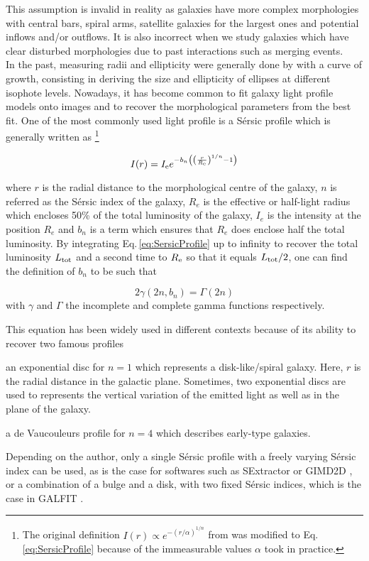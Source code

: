 This assumption is invalid in reality as galaxies have more complex morphologies with central bars, spiral arms, satellite galaxies for the largest ones and potential inflows and/or outflows. It is also incorrect when we study galaxies which have clear disturbed morphologies due to past interactions such as merging events.  \\

In the past, measuring radii and ellipticity were generally done by with a curve of growth, consisting in deriving the size and ellipticity of ellipses at different isophote levels. Nowadays, it has become common to fit galaxy light profile models onto images and to recover the morphological parameters from the best fit. One of the most commonly used light profile is a Sérsic profile which is generally written as \footnote{The original definition $I(r) \propto e^{-(r/\alpha)^{1/n}}$ from  was modified to Eq.\,\ref{eq:SersicProfile} because of the immeasurable values $\alpha$ took in practice.} 

\begin{equation}
    \label{eq:SersicProfile}
    I(r) = I_{\rm{e}} e^{ - b_n \left ( \left  ( \frac{r}{R_{\rm{e}}}  \right )^{1/n} - 1 \right ) }
\end{equation}

where $r$ is the radial distance to the morphological centre of the galaxy, $n$ is referred as the Sérsic index of the galaxy, $R_e$ is the effective or half-light radius which encloses 50\% of the total luminosity of the galaxy, $I_e$ is the intensity at the position $R_e$ and $b_n$ is a term which ensures that $R_e$ does enclose half the total luminosity. By integrating Eq.\,\ref{eq:SersicProfile} up to infinity to recover the total luminosity $L_{\rm{tot}}$ and a second time to $R_{\rm{e}}$ so that it equals $L_{\rm{tot}}/2$, one can find the definition of $b_n$ to be such that 

\begin{equation}
2 \gamma (2n, b_n) = \Gamma (2n)
\end{equation}
with $\gamma$ and $\Gamma$ the incomplete and complete gamma functions respectively.

This equation has been widely used in different contexts because of its ability to recover two famous profiles
\begin{enumerate*}[label={(\alph*)}]
    \item an exponential disc for $n = 1$ which represents a disk-like/spiral galaxy. Here, $r$ is the radial distance in the galactic plane. Sometimes, two exponential discs are used to represents the vertical variation of the emitted light as well as in the plane of the galaxy. 
    \item a de Vaucouleurs profile for $n = 4$ which describes early-type galaxies.
\end{enumerate*}
Depending on the author, only a single Sérsic profile with a freely varying Sérsic index can be used, as is the case for softwares such as SExtractor  or GIMD2D , or a combination of a bulge and a disk, with two fixed Sérsic indices, which is the case in GALFIT . \\


